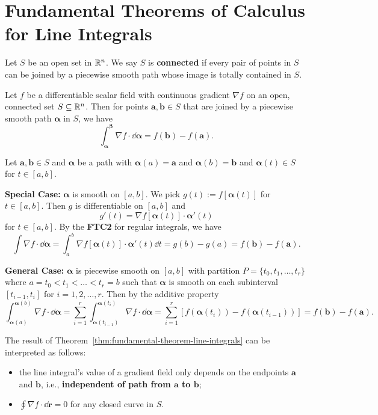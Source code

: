     \section{Fundamental Theorems of Calculus for Line Integrals}
    \begin{definitionenv}
        Let $S$ be an open set in $\mathbb{R}^n$. We say $S$ is \textbf{connected} if every pair of points in $S$ can be joined by a piecewise smooth path whose image is totally contained in $S$. 
    \end{definitionenv}
    \begin{theoremenv}\label{thm:fundamental-theorem-line-integrals}
        Let $f$ be a differentiable scalar field with continuous gradient $\nabla f$ on an open, connected set $S \subseteq \mathbb{R}^n$. Then for points $\bm a, \bm b \in S$ that are joined by a piecewise smooth path $\bm \alpha$ in $S$, we have
        $$ \int_{\bm \alpha}^{\bm \beta} \nabla f \cdot \dd \bm \alpha = f(\bm b) - f(\bm a). $$
    \end{theoremenv}
    \begin{proofenv}
        Let $\bm a, \bm b \in S$ and $\bm \alpha$ be a path with $\bm \alpha(a) = \bm a$ and $\bm \alpha(b) = \bm b$ and $\bm \alpha(t) \in S$ for $t\in [a,b]$.

        \textbf{Special Case:} $\bm \alpha$ is smooth on $[a,b]$. We pick $g(t) := f[\bm \alpha(t)]$ for $t\in [a,b]$. Then $g$ is differentiable on $[a,b]$ and
        $$ g'(t) = \nabla f[\bm \alpha(t)] \cdot \bm \alpha'(t) $$
        for $t\in [a,b]$. By the \textbf{FTC2} for regular integrals, we have
        $$\int \nabla f \cdot \dd \bm \alpha = \int_a^b \nabla f[\bm \alpha(t)] \cdot \bm \alpha'(t) \dd t = g(b) - g(a) = f(\bm b) - f(\bm a). $$

        \textbf{General Case:} $\bm \alpha$ is piecewise smooth on $[a,b]$ with partition $P=\{ t_0, t_1, \dots, t_r \}$ where $a=t_0 < t_1 < \dots < t_r = b$ such that $\bm \alpha$ is smooth on each subinterval $[t_{i-1}, t_i]$ for $i=1,2,\dots,r$. Then by the additive property
        $$ \int_{\bm \alpha( a)}^{\bm \alpha(b)} \nabla f \cdot \dd \bm \alpha = \sum_{i=1}^r \int_{\bm \alpha(t_{i-1})}^{\bm \alpha(t_i)} \nabla f \cdot \dd \bm \alpha = \sum_{i=1}^r [f(\bm \alpha(t_i)) - f(\bm \alpha(t_{i-1}))] = f(\bm b) - f(\bm a). $$
    \end{proofenv}
    \begin{remarkenv}
        The result of Theorem~\ref{thm:fundamental-theorem-line-integrals} can be interpreted as follows: 
        \begin{itemize}
            \item the line integral's value of a gradient field only depends on the endpoints $\bm a$ and $\bm b$, i.e., \textbf{independent of path from $\bm a$ to $\bm b$};
            \item $\displaystyle \oint \nabla f \cdot \dd \bm r = 0$ for any closed curve in $S$.
        \end{itemize}
    \end{remarkenv}
